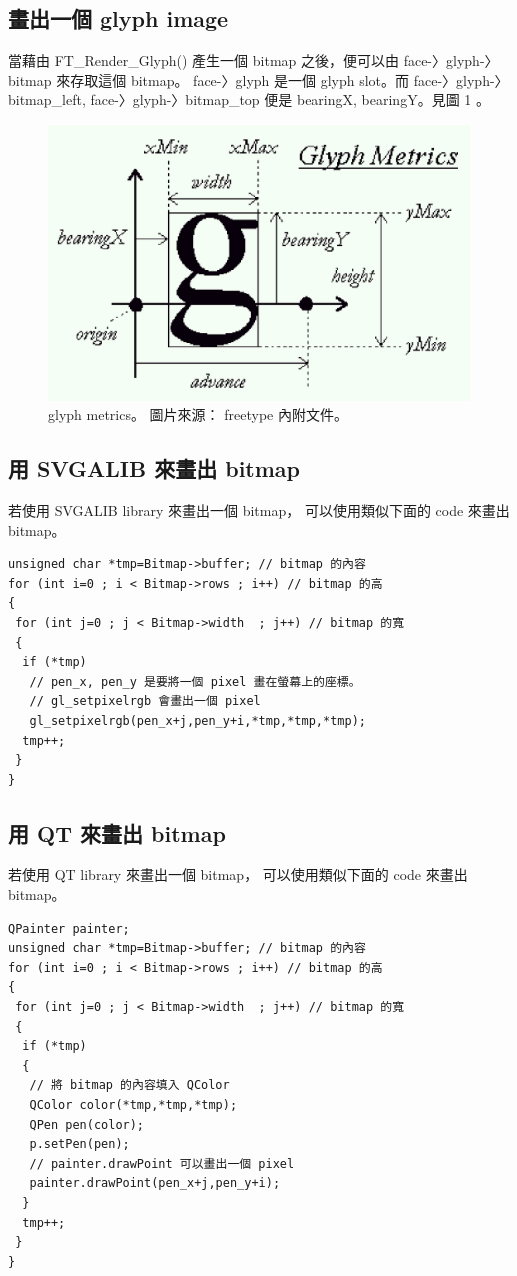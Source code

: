 \documentclass[12pt,a4]{article}
\begin{document}
\begin{CJK}{UTF8}{cwmu}
\section{畫出一個 glyph image}
當藉由 FT\_{}Render\_{}Glyph() 產生一個 bitmap 之後，便可以由 face-〉glyph-〉bitmap
來存取這個 bitmap。 face-〉glyph 是一個 glyph slot。而 face-〉glyph-〉bitmap\_{}left,
face-〉glyph-〉bitmap\_{}top 便是 bearingX, bearingY。見圖 1 。
\begin{figure}
\caption{glyph metrics。 圖片來源： freetype 內附文件。}
\begin{center}
\includegraphics[scale=0.7]{metrics.eps}
\end{center}
\end{figure}
\subsection{用 SVGALIB 來畫出 bitmap}
若使用 SVGALIB library 來畫出一個 bitmap， 可以使用類似下面的 code 來畫出 bitmap。
\begin{Verbatim}[commandchars=@\[\]]
unsigned char *tmp=Bitmap->buffer; // bitmap 的內容
for (int i=0 ; i < Bitmap->rows ; i++) // bitmap 的高
{
 for (int j=0 ; j < Bitmap->width  ; j++) // bitmap 的寬
 {
  if (*tmp)
   // pen_x, pen_y 是要將一個 pixel 畫在螢幕上的座標。
   // gl_setpixelrgb 會畫出一個 pixel
   gl_setpixelrgb(pen_x+j,pen_y+i,*tmp,*tmp,*tmp);
  tmp++;
 }
}
\end{Verbatim}

\subsection{用 QT 來畫出 bitmap}
若使用 QT library 來畫出一個 bitmap， 可以使用類似下面的 code 來畫出 bitmap。
\begin{Verbatim}[commandchars=@\[\]]
QPainter painter;
unsigned char *tmp=Bitmap->buffer; // bitmap 的內容
for (int i=0 ; i < Bitmap->rows ; i++) // bitmap 的高
{
 for (int j=0 ; j < Bitmap->width  ; j++) // bitmap 的寬
 {
  if (*tmp)
  {
   // 將 bitmap 的內容填入 QColor
   QColor color(*tmp,*tmp,*tmp);
   QPen pen(color);
   p.setPen(pen);
   // painter.drawPoint 可以畫出一個 pixel
   painter.drawPoint(pen_x+j,pen_y+i);
  }
  tmp++;
 }
}
\end{Verbatim}
\newpage

\end{CJK}
\end{document}
